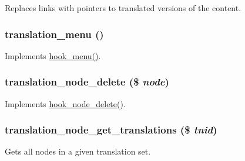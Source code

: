 Replaces links with pointers to translated versions of the content. \hypertarget{translation_8module_a31c2f0307fce1bcb4da69eda5131f4c5}{
\subsubsection[{translation\_\-menu}]{\setlength{\rightskip}{0pt plus 5cm}translation\_\-menu ()}}
\label{translation_8module_a31c2f0307fce1bcb4da69eda5131f4c5}
Implements \hyperlink{group__hooks_ga5c95244fea59b25666e409759e133ded}{hook\_\-menu()}. \hypertarget{translation_8module_a37691855a67b4d13490077dd814a7a56}{
\subsubsection[{translation\_\-node\_\-delete}]{\setlength{\rightskip}{0pt plus 5cm}translation\_\-node\_\-delete (\$ {\em node})}}
\label{translation_8module_a37691855a67b4d13490077dd814a7a56}
Implements \hyperlink{group__node__api__hooks_ga66ea0473a9950dc961802e801e5042e9}{hook\_\-node\_\-delete()}. \hypertarget{translation_8module_a9cd21a77e9349062baa9a7c861797204}{
\subsubsection[{translation\_\-node\_\-get\_\-translations}]{\setlength{\rightskip}{0pt plus 5cm}translation\_\-node\_\-get\_\-translations (\$ {\em tnid})}}
\label{translation_8module_a9cd21a77e9349062baa9a7c861797204}
Gets all nodes in a given translation set.


